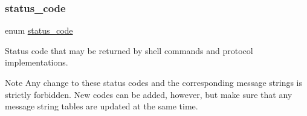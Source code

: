 \mbox{\label{group__group__sam0__utils__status__codes_ga751c892e5a46b8e7d282085a5a5bf151}} 
\subsubsection{\texorpdfstring{status\_code}{status\_code}}
{\footnotesize\ttfamily enum \mbox{\hyperlink{group__group__sam0__utils__status__codes_ga751c892e5a46b8e7d282085a5a5bf151}{status\+\_\+code}}}

Status code that may be returned by shell commands and protocol implementations.

\begin{DoxyNote}{Note}
Any change to these status codes and the corresponding message strings is strictly forbidden. New codes can be added, however, but make sure that any message string tables are updated at the same time. 
\end{DoxyNote}
